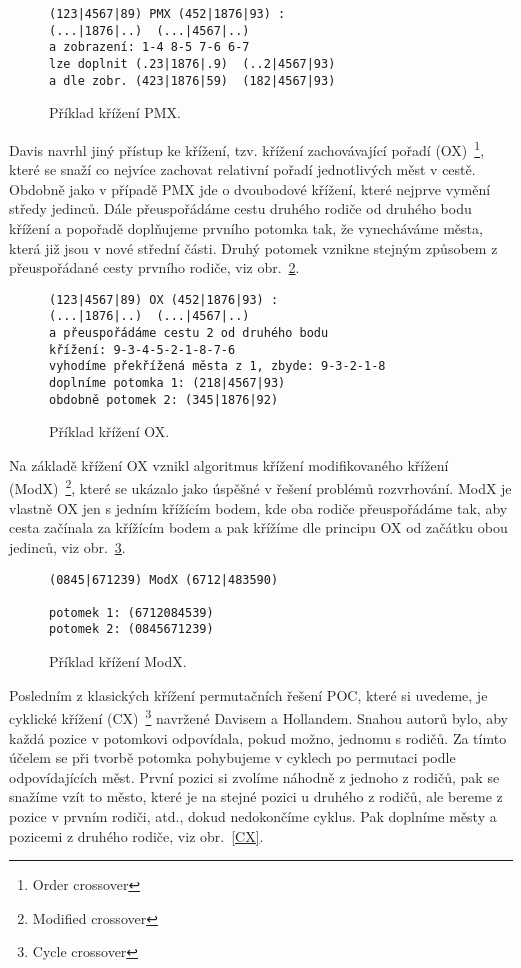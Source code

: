 \begin{figure}%
\begin{verbatim}
(123|4567|89) PMX (452|1876|93) :
(...|1876|..)  (...|4567|..) 
a zobrazení: 1-4 8-5 7-6 6-7 
lze doplnit (.23|1876|.9)  (..2|4567|93)
a dle zobr. (423|1876|59)  (182|4567|93)
\end{verbatim}
\caption{Příklad křížení PMX.}%
\label{PMX}%
\end{figure}

Davis navrhl jiný přístup ke křížení, tzv. křížení zachovávající pořadí (OX)~\footnote{Order crossover}, které se snaží co nejvíce zachovat relativní pořadí jednotlivých měst v cestě. Obdobně jako v případě PMX jde o dvoubodové křížení, které nejprve vymění středy jedinců. Dále přeuspořádáme cestu druhého rodiče od druhého bodu křížení a popořadě doplňujeme prvního potomka tak, že vynecháváme města, která již jsou v nové střední části. Druhý potomek vznikne stejným způsobem z přeuspořádané cesty prvního rodiče, viz obr.~\ref{OX}.   


\begin{figure}%
\begin{verbatim}
(123|4567|89) OX (452|1876|93) : 
(...|1876|..)  (...|4567|..) 
a přeuspořádáme cestu 2 od druhého bodu 
křížení: 9-3-4-5-2-1-8-7-6
vyhodíme překřížená města z 1, zbyde: 9-3-2-1-8
doplníme potomka 1: (218|4567|93)
obdobně potomek 2: (345|1876|92)
\end{verbatim}
\caption{Příklad křížení OX.}%
\label{OX}%
\end{figure}

Na základě křížení OX vznikl algoritmus křížení modifikovaného křížení (ModX)~\footnote{Modified crossover}, které se ukázalo jako úspěšné v řešení problémů rozvrhování. ModX je vlastně OX jen s jedním křížícím bodem, kde oba rodiče přeuspořádáme tak, aby cesta začínala za křížícím bodem a pak křížíme dle principu OX od začátku obou jedinců, viz obr.~\ref{ModX}.    

\begin{figure}%
\begin{verbatim}
(0845|671239) ModX (6712|483590)

potomek 1: (6712084539)
potomek 2: (0845671239) 
\end{verbatim}
\caption{Příklad křížení ModX.}%
\label{ModX}%
\end{figure}

Posledním z klasických křížení permutačních řešení POC, které si uvedeme, je cyklické křížení (CX)~\footnote{Cycle crossover} navržené Davisem a Hollandem. Snahou autorů bylo, aby každá pozice v potomkovi odpovídala, pokud možno, jednomu s rodičů. Za tímto účelem se při tvorbě potomka pohybujeme v cyklech po permutaci podle odpovídajících měst. První pozici si zvolíme náhodně z jednoho z rodičů, pak se snažíme vzít to město, které je na stejné pozici u druhého z rodičů, ale bereme z pozice v prvním rodiči, atd., dokud nedokončíme cyklus. Pak doplníme městy a pozicemi z druhého rodiče, viz obr.~\ref{CX}.  

